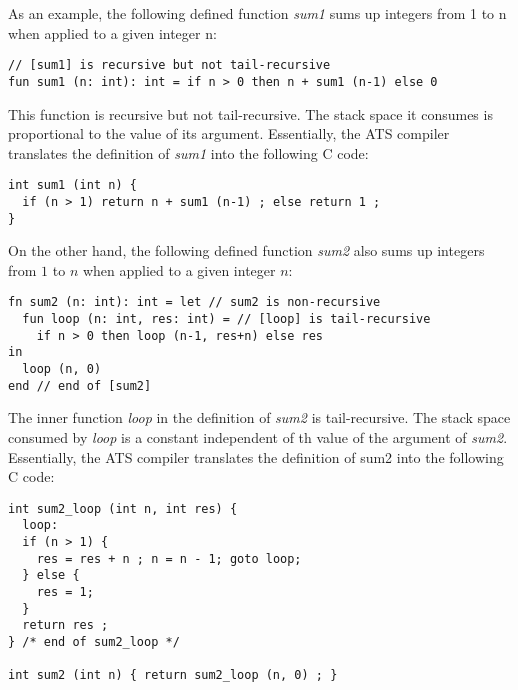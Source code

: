 As an example, the following defined function {\it sum1} sums up integers
from 1 to n when applied to a given integer n:
\begin{verbatim}
// [sum1] is recursive but not tail-recursive
fun sum1 (n: int): int = if n > 0 then n + sum1 (n-1) else 0
\end{verbatim}
This function is recursive but not tail-recursive. The stack space it
consumes is proportional to the value of its argument. Essentially, the ATS
compiler translates the definition of {\it sum1} into the following C code:
\begin{verbatim}
int sum1 (int n) {
  if (n > 1) return n + sum1 (n-1) ; else return 1 ;
}
\end{verbatim}
On the other hand, the following defined function {\it sum2} also sums up
integers from $1$ to $n$ when applied to a given integer $n$:
\begin{verbatim}
fn sum2 (n: int): int = let // sum2 is non-recursive
  fun loop (n: int, res: int) = // [loop] is tail-recursive
    if n > 0 then loop (n-1, res+n) else res
in
  loop (n, 0)
end // end of [sum2]
\end{verbatim}
The inner function {\it loop} in the definition of {\it sum2} is
tail-recursive. The stack space consumed by {\it loop} is a constant
independent of th value of the argument of {\it sum2}. Essentially, the ATS
compiler translates the definition of sum2 into the following C code:
\begin{verbatim}
int sum2_loop (int n, int res) {
  loop:
  if (n > 1) {
    res = res + n ; n = n - 1; goto loop; 
  } else {
    res = 1;
  }
  return res ;
} /* end of sum2_loop */

int sum2 (int n) { return sum2_loop (n, 0) ; }
\end{verbatim}

